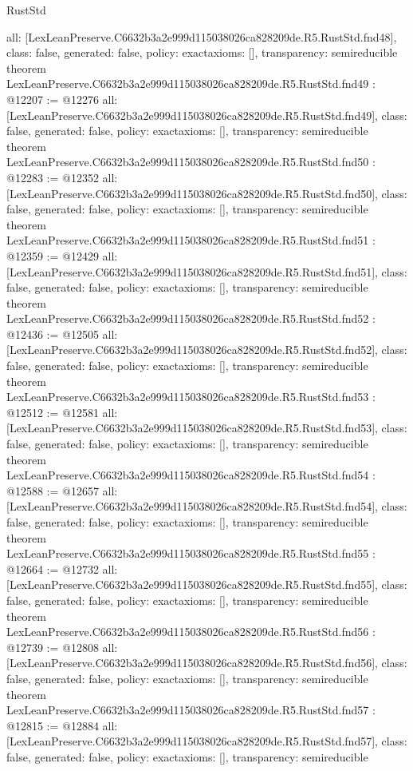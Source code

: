 \begin{lexlean}{RustStd}
\begin{coremodule}
{  all: [LexLeanPreserve.C6632b3a2e999d115038026ca828209de.R5.RustStd.fnd48],
  class: false,
  generated: false,
  policy: exact{axioms: []},
  transparency: semireducible
}
theorem LexLeanPreserve.C6632b3a2e999d115038026ca828209de.R5.RustStd.fnd49 : @12207 := @12276 {
  all: [LexLeanPreserve.C6632b3a2e999d115038026ca828209de.R5.RustStd.fnd49],
  class: false,
  generated: false,
  policy: exact{axioms: []},
  transparency: semireducible
}
theorem LexLeanPreserve.C6632b3a2e999d115038026ca828209de.R5.RustStd.fnd50 : @12283 := @12352 {
  all: [LexLeanPreserve.C6632b3a2e999d115038026ca828209de.R5.RustStd.fnd50],
  class: false,
  generated: false,
  policy: exact{axioms: []},
  transparency: semireducible
}
theorem LexLeanPreserve.C6632b3a2e999d115038026ca828209de.R5.RustStd.fnd51 : @12359 := @12429 {
  all: [LexLeanPreserve.C6632b3a2e999d115038026ca828209de.R5.RustStd.fnd51],
  class: false,
  generated: false,
  policy: exact{axioms: []},
  transparency: semireducible
}
theorem LexLeanPreserve.C6632b3a2e999d115038026ca828209de.R5.RustStd.fnd52 : @12436 := @12505 {
  all: [LexLeanPreserve.C6632b3a2e999d115038026ca828209de.R5.RustStd.fnd52],
  class: false,
  generated: false,
  policy: exact{axioms: []},
  transparency: semireducible
}
theorem LexLeanPreserve.C6632b3a2e999d115038026ca828209de.R5.RustStd.fnd53 : @12512 := @12581 {
  all: [LexLeanPreserve.C6632b3a2e999d115038026ca828209de.R5.RustStd.fnd53],
  class: false,
  generated: false,
  policy: exact{axioms: []},
  transparency: semireducible
}
theorem LexLeanPreserve.C6632b3a2e999d115038026ca828209de.R5.RustStd.fnd54 : @12588 := @12657 {
  all: [LexLeanPreserve.C6632b3a2e999d115038026ca828209de.R5.RustStd.fnd54],
  class: false,
  generated: false,
  policy: exact{axioms: []},
  transparency: semireducible
}
theorem LexLeanPreserve.C6632b3a2e999d115038026ca828209de.R5.RustStd.fnd55 : @12664 := @12732 {
  all: [LexLeanPreserve.C6632b3a2e999d115038026ca828209de.R5.RustStd.fnd55],
  class: false,
  generated: false,
  policy: exact{axioms: []},
  transparency: semireducible
}
theorem LexLeanPreserve.C6632b3a2e999d115038026ca828209de.R5.RustStd.fnd56 : @12739 := @12808 {
  all: [LexLeanPreserve.C6632b3a2e999d115038026ca828209de.R5.RustStd.fnd56],
  class: false,
  generated: false,
  policy: exact{axioms: []},
  transparency: semireducible
}
theorem LexLeanPreserve.C6632b3a2e999d115038026ca828209de.R5.RustStd.fnd57 : @12815 := @12884 {
  all: [LexLeanPreserve.C6632b3a2e999d115038026ca828209de.R5.RustStd.fnd57],
  class: false,
  generated: false,
  policy: exact{axioms: []},
  transparency: semireducible
}
\end{coremodule}
\end{lexlean}
